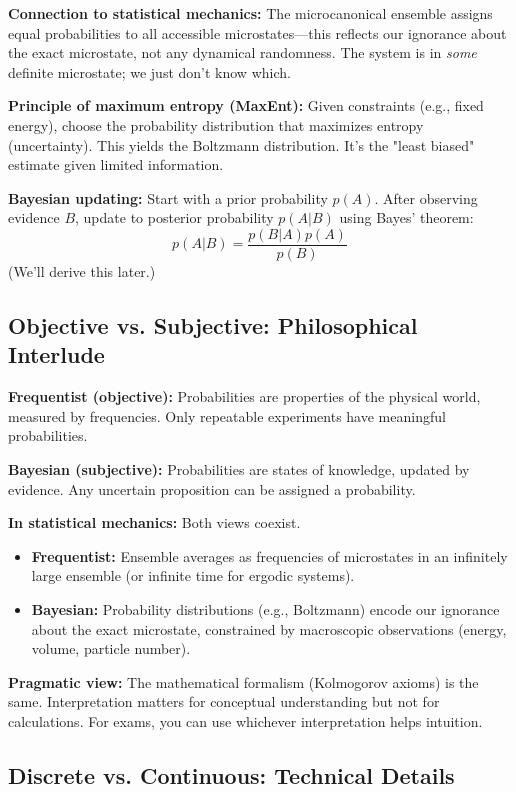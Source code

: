 \documentclass[9pt,twocoloumn]{article}
\begin{document}
\textbf{Connection to statistical mechanics:} The microcanonical ensemble assigns equal probabilities to all accessible microstates—this reflects our ignorance about the exact microstate, not any dynamical randomness. The system is in \emph{some} definite microstate; we just don't know which.

\textbf{Principle of maximum entropy (MaxEnt):} Given constraints (e.g., fixed energy), choose the probability distribution that maximizes entropy (uncertainty). This yields the Boltzmann distribution. It's the "least biased" estimate given limited information.

\textbf{Bayesian updating:} Start with a prior probability $p(A)$. After observing evidence $B$, update to posterior probability $p(A|B)$ using Bayes' theorem:
\begin{equation}
p(A|B) = \frac{p(B|A) p(A)}{p(B)}
\end{equation}
(We'll derive this later.)

\subsection{Objective vs. Subjective: Philosophical Interlude}

\textbf{Frequentist (objective):} Probabilities are properties of the physical world, measured by frequencies. Only repeatable experiments have meaningful probabilities.

\textbf{Bayesian (subjective):} Probabilities are states of knowledge, updated by evidence. Any uncertain proposition can be assigned a probability.

\textbf{In statistical mechanics:} Both views coexist.
\begin{itemize}
    \item \textbf{Frequentist:} Ensemble averages as frequencies of microstates in an infinitely large ensemble (or infinite time for ergodic systems).
    \item \textbf{Bayesian:} Probability distributions (e.g., Boltzmann) encode our ignorance about the exact microstate, constrained by macroscopic observations (energy, volume, particle number).
\end{itemize}

\textbf{Pragmatic view:} The mathematical formalism (Kolmogorov axioms) is the same. Interpretation matters for conceptual understanding but not for calculations. For exams, you can use whichever interpretation helps intuition.

\subsection{Discrete vs. Continuous: Technical Details}
\end{document}
